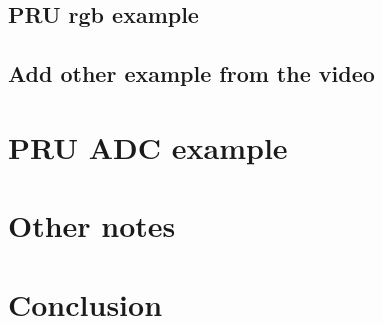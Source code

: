 \documentclass{article}
\begin{document}
\subsection{PRU rgb example}
\subsection{Add other example from the video}
\section{PRU ADC example}


\section{Other notes}

\section{Conclusion}
\end{document}
